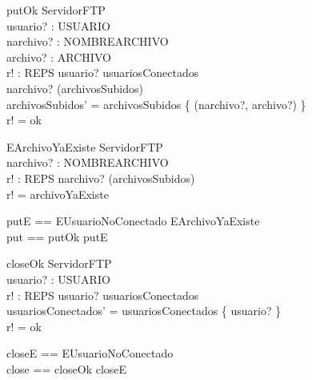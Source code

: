 \documentclass[11pt]{article}
\begin{document}
  \begin{schema}{putOk}
  \Delta ServidorFTP \\
  usuario? : USUARIO \\
  narchivo? : NOMBREARCHIVO \\
  archivo? : ARCHIVO \\
  r! : REPS
  \where
  usuario? \in usuariosConectados \\
  narchivo? \notin (\dom archivosSubidos) \\
  archivosSubidos' = archivosSubidos \cup \{ (narchivo?, archivo?) \} \\
  r! = ok
  \end{schema}
  
  \begin{schema}{EArchivoYaExiste}
  \Xi ServidorFTP \\
  narchivo? : NOMBREARCHIVO \\
  r! : REPS
  \where
  narchivo? \in (\dom archivosSubidos) \\
  r! = archivoYaExiste
  \end{schema}
  
  \begin{zed}
  putE == EUsuarioNoConectado \lor EArchivoYaExiste \\
  put == putOk \lor putE
  \end{zed}
  
  \begin{schema}{closeOk}
  \Delta ServidorFTP \\
  usuario? : USUARIO \\
  r! : REPS
  \where
  usuario? \in usuariosConectados \\
  usuariosConectados' = usuariosConectados \setminus \{ usuario? \} \\
  r! = ok
  \end{schema}
  
  \begin{zed}
  closeE == EUsuarioNoConectado \\
  close == closeOk \lor closeE
  \end{zed}
\end{document}
